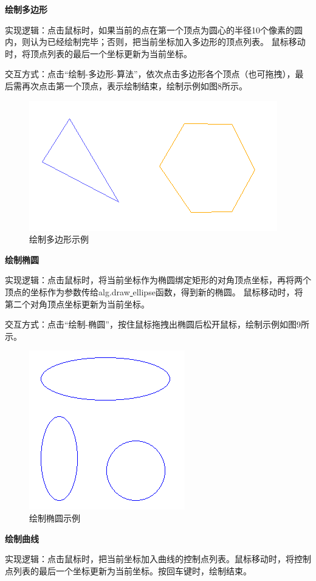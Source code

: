 \documentclass[a4paper,UTF8]{article}
\begin{document}
\textbf{绘制多边形}

实现逻辑：点击鼠标时，如果当前的点在第一个顶点为圆心的半径10个像素的圆内，则认为已经绘制完毕；否则，把当前坐标加入多边形的顶点列表。
鼠标移动时，将顶点列表的最后一个坐标更新为当前坐标。

交互方式：点击“绘制-多边形-算法”，依次点击多边形各个顶点（也可拖拽），最后需再次点击第一个顶点，表示绘制结束，绘制示例如图8所示。
\begin{figure}[H]
    \centering
    \includegraphics[scale=0.8]{draw-polygen.PNG}
    \caption{绘制多边形示例}
\end{figure}

\textbf{绘制椭圆}

实现逻辑：点击鼠标时，将当前坐标作为椭圆绑定矩形的对角顶点坐标，再将两个顶点的坐标作为参数传给alg.draw\underline{ }ellipse函数，得到新的椭圆。
鼠标移动时，将第二个对角顶点坐标更新为当前坐标。

交互方式：点击“绘制-椭圆”，按住鼠标拖拽出椭圆后松开鼠标，绘制示例如图9所示。
\begin{figure}[H]
    \centering
    \includegraphics[scale=0.8]{draw-ellipse.PNG}
    \caption{绘制椭圆示例}
\end{figure}

\textbf{绘制曲线}

实现逻辑：点击鼠标时，把当前坐标加入曲线的控制点列表。鼠标移动时，将控制点列表的最后一个坐标更新为当前坐标。按回车键时，绘制结束。
\end{document}
